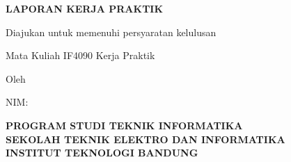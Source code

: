 \begin{titlepage}
\begin{center}
\vspace*{0.2cm}
{\bfseries\Large LAPORAN KERJA PRAKTIK\par}
\vspace{0.6cm}
{\bfseries\large \JudulLaporan\par}
\vspace{0.8cm}
{Diajukan untuk memenuhi persyaratan kelulusan\par
Mata Kuliah IF4090 Kerja Praktik\par}
\vspace{0.6cm}
{Oleh\par
\large \textbf{\NamaMahasiswa}\par
\large NIM: \NIM\par}
\vfill
\PlaceholderLogo
\vfill
{\bfseries\small PROGRAM STUDI TEKNIK INFORMATIKA\\
SEKOLAH TEKNIK ELEKTRO DAN INFORMATIKA\\
INSTITUT TEKNOLOGI BANDUNG\\
\Tahun\par}
\end{center}
\end{titlepage}
